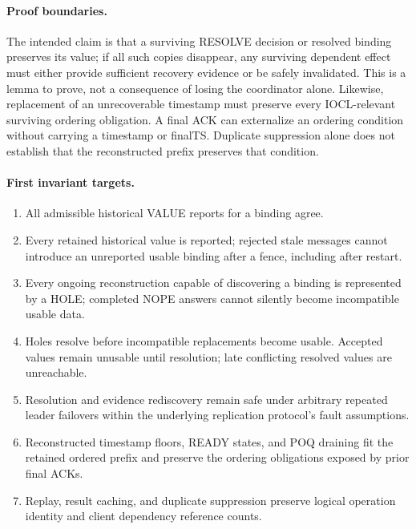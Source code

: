 \paragraph{Proof boundaries.}
The intended claim is that a surviving RESOLVE decision or resolved binding
preserves its value; if all such copies disappear, any surviving dependent effect
must either provide sufficient recovery evidence or be safely invalidated. This
is a lemma to prove, not a consequence of losing the coordinator alone.
Likewise, replacement of an unrecoverable timestamp must preserve every
IOCL-relevant surviving ordering obligation. A final ACK can externalize an
ordering condition without carrying a timestamp or finalTS. Duplicate suppression
alone does not establish that the reconstructed prefix preserves that condition.

\paragraph{First invariant targets.}
\begin{enumerate}
\item All admissible historical VALUE reports for a binding agree.
\item Every retained historical value is reported; rejected stale messages cannot
introduce an unreported usable binding after a fence, including after restart.
\item Every ongoing reconstruction capable of discovering a binding is represented
by a HOLE; completed NOPE answers cannot silently become incompatible usable data.
\item Holes resolve before incompatible replacements become usable. Accepted values
remain unusable until resolution; late conflicting resolved values are unreachable.
\item Resolution and evidence rediscovery remain safe under arbitrary repeated
leader failovers within the underlying replication protocol's fault assumptions.
\item Reconstructed timestamp floors, READY states, and POQ draining fit the retained
ordered prefix and preserve the ordering obligations exposed by prior final ACKs.
\item Replay, result caching, and duplicate suppression preserve logical operation
identity and client dependency reference counts.
\end{enumerate}
